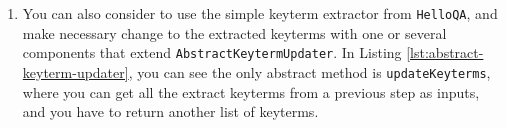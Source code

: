 \begin{enumerate}
\item You can also consider to use the simple keyterm extractor from
\texttt{HelloQA}, and make necessary change to the extracted keyterms with one
or several components that extend \texttt{AbstractKeytermUpdater}. In Listing
\ref{lst:abstract-keyterm-updater}, you can see the only abstract method is
\verb|updateKeyterms|, where you can get all the extract keyterms from a
previous step as inputs, and you have to return another list of keyterms.



\end{enumerate}
